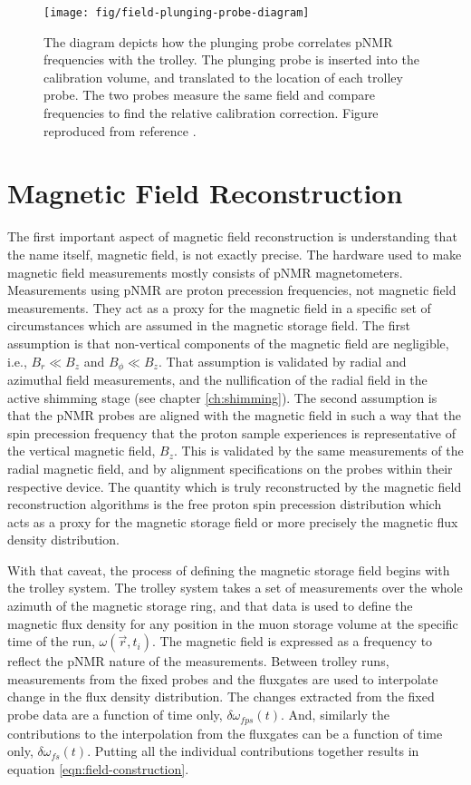 \begin{figure}
\label{fig:field-plunging-probe-diagram}
\texttt{[image: fig/field-plunging-probe-diagram]}
\caption{The diagram depicts how the plunging probe correlates pNMR frequencies with the trolley.  The plunging probe is inserted into the calibration volume, and translated to the location of each trolley probe.  The two probes measure the same field and compare frequencies to find the relative calibration correction. Figure reproduced from reference \cite{kawall-priv}.}
\end{figure}

\section{Magnetic Field Reconstruction}
The first important aspect of magnetic field reconstruction is understanding that the name itself, magnetic field, is not exactly precise.  The hardware used to make magnetic field measurements mostly consists of pNMR magnetometers.  Measurements using pNMR are proton precession frequencies, not magnetic field measurements.  They act as a proxy for the magnetic field in a specific set of circumstances which are assumed in the \mugmtwo magnetic storage field.  The first assumption is that non-vertical components of the magnetic field are negligible, i.e., $B_r \ll B_z$ and $B_\phi \ll B_z$.  That assumption is validated by radial and azimuthal field measurements, and the nullification of the radial field in the active shimming stage (see chapter \ref{ch:shimming}).  The second assumption is that the pNMR probes are aligned with the magnetic field in such a way that the spin precession frequency that the proton sample experiences is representative of the vertical magnetic field, $B_z$.  This is validated by the same measurements of the radial magnetic field, and by alignment specifications on the probes within their respective device.  The quantity which is truly reconstructed by the magnetic field reconstruction algorithms is the free proton spin precession distribution which acts as a proxy for the magnetic storage field or more precisely the magnetic flux density distribution.

With that caveat, the process of defining the \gmtwo magnetic storage field begins with the trolley system.  The trolley system takes a set of measurements over the whole azimuth of the magnetic storage ring, and that data is used to define the magnetic flux density for any position in the muon storage volume at the specific time of the run, $\omega(\vec{r}, t_i)$. The magnetic field is expressed as a frequency to reflect the pNMR nature of the measurements.  Between trolley runs, measurements from the fixed probes and the fluxgates are used to interpolate change in the flux density distribution.  The changes extracted from the fixed probe data are a function of time only, $\delta \omega_{fps}(t)$.  And, similarly the contributions to the interpolation from the fluxgates can be a function of time only, $\delta \omega_{fs}(t)$.  Putting all the individual contributions together results in equation \ref{eqn:field-construction}.

